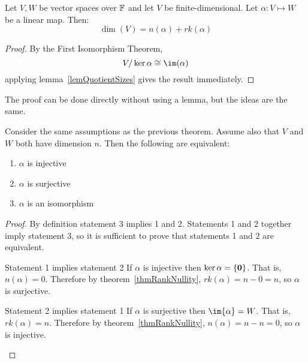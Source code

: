 \documentclass[../Main.tex]{subfiles}
\begin{document}
\begin{theorem}
    Let $V, W$ be vector spaces over $\mathbb{F}$ and let $V$ be finite-dimensional. Let $\alpha : V \mapsto W$ be a linear map. Then:
    \begin{equation}
        \dim(V) = n(\alpha) + rk(\alpha)
        \label{eqnRankNullity}
    \end{equation}
    \label{thmRankNullity}
\end{theorem}
\begin{proof}
    By the First Isomorphism Theorem,
    \begin{equation*}
        V / \ker{\alpha} \isom \im(\alpha)
    \end{equation*}
    applying lemma~\ref{lemQuotientSizes} gives the result immediately.
\end{proof}
\begin{remark}
    The proof can be done directly without using a lemma, but the ideas are the same.
\end{remark}
\begin{corollary}
    Consider the same assumptions as the previous theorem. Assume also that $V$ and $W$ both have dimension $n$. Then the following are equivalent:
    \begin{enumerate}
        \item $\alpha$ is injective
        \item $\alpha$ is surjective
        \item $\alpha$ is an isomorphism
    \end{enumerate}
    \label{corLinPidge}
\end{corollary}
\begin{proof}
    By definition statement 3 implies 1 and 2. Statements 1 and 2 together imply statement 3, so it is sufficient to prove that statements 1 and 2 are equivalent.

    \begin{subproof}{Statement 1 implies statement 2}
        If $\alpha$ is injective then $\ker{\alpha} = \{\boldsymbol{0}\}$. That is, $n(\alpha) = 0$. Therefore by theorem~\ref{thmRankNullity}, $rk(\alpha) = n-0 = n$, so $\alpha$ is surjective.
    \end{subproof}
    \begin{subproof}{Statement 2 implies statement 1}
        If $\alpha$ is surjective then $\im{\alpha} = W$. That is, $rk(\alpha) = n$. Therefore by theorem~\ref{thmRankNullity}, $n(\alpha) = n-n = 0$, so $\alpha$ is injective.
    \end{subproof}
\end{proof}
\end{document}
